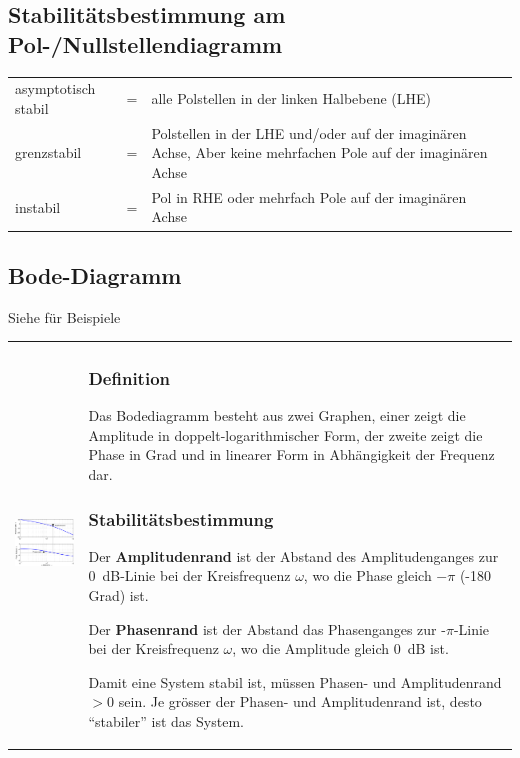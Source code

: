 \subsection{Stabilitätsbestimmung am Pol-/Nullstellendiagramm}
\begin{tabular}{lcp{13cm}}
	asymptotisch stabil & = & alle Polstellen in der linken Halbebene (LHE) \\
	grenzstabil & = & Polstellen in der LHE und/oder auf der imaginären 
  Achse, Aber keine mehrfachen Pole auf der imaginären Achse \\
  instabil & = & Pol in RHE oder mehrfach Pole auf der imaginären Achse
\end{tabular}

\subsection{Bode-Diagramm  }
Siehe  für Beispiele\\
\begin{tabular}{ll}
	\parbox{7cm}{
		\includegraphics[width=7cm]{./images/bode-stabilitaet.png}
	}
	& \parbox{11cm}{
		\subsubsection{Definition}
		Das Bodediagramm besteht aus zwei Graphen, einer zeigt die Amplitude in
		doppelt-logarithmischer Form, der zweite zeigt die Phase in Grad und in
		linearer Form in Abhängigkeit der Frequenz dar.
		
		\subsubsection{Stabilitätsbestimmung  }
		Der {\bf Amplitudenrand} ist der Abstand des
		Amplitudenganges zur 0~dB-Linie bei der Kreisfrequenz $\omega$, wo die Phase
		gleich $-\pi$ (-180 Grad) ist. \\
		
		Der {\bf Phasenrand} ist der Abstand das Phasenganges zur
		-$\pi$-Linie bei der Kreisfrequenz $\omega$, wo die Amplitude gleich 0~dB
		ist. \\
		
		Damit eine System stabil ist, m\"ussen Phasen- und Amplitudenrand
		$>0$ sein. Je gr\"osser der Phasen- und Amplitudenrand ist, desto
		``stabiler'' ist das System.
	}
\end{tabular}

